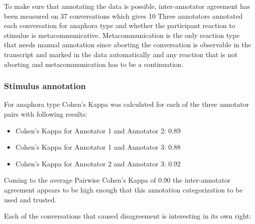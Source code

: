 \documentclass[12pt]{report}
\begin{document}
{To make sure that annotating the data is possible,
inter-annotator agreement has been measured on 37 conversations which gives 10%
Three annotators annotated each conversation for anaphora type and
whether the participant reaction to stimulus is metacommunicative.
Metacommunication is the only reaction type that needs manual annotation since
aborting the conversation is
observable in the transcript and marked in the data automatically
and any reaction that is not aborting and metacommunication has to be a continuation.

\subsubsection{Stimulus annotation}

For anaphora type Cohen's Kappa was calculated for each of the three annotator pairs
with following results:

\begin{itemize}[label={}]
    \item Cohen's Kappa for Annotator 1 and Annotator 2: 0.89
    \item Cohen's Kappa for Annotator 1 and Annotator 3: 0.88
    \item Cohen's Kappa for Annotator 2 and Annotator 3: 0.92
\end{itemize}

Coming to the average Pairwise Cohen's Kappa of 0.90
the inter-annotator agreement appears to be high enough
that this annotation categorization to be used and trusted.

Each of the conversations that caused disagreement is interesting in its own right:


}
\end{document}
